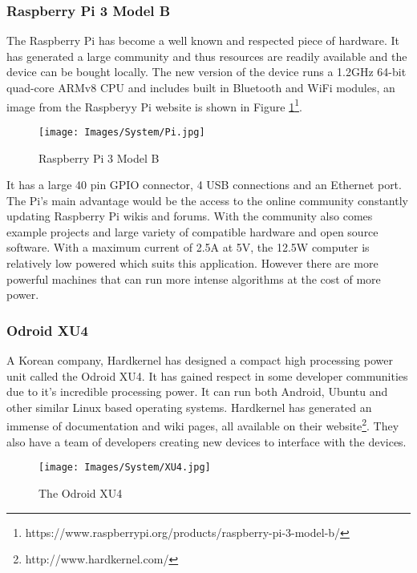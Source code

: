 				\subsubsection{Raspberry Pi 3 Model B}
				
				The Raspberry Pi has become a well known and respected piece of hardware. It has generated a large community and thus resources are readily available and the device can be bought locally. The new version of the device runs a 1.2GHz 64-bit quad-core ARMv8 CPU and includes built in Bluetooth and WiFi modules, an image from the Raspberyy Pi website is shown in Figure \ref{IM_Pi}\footnote{https://www.raspberrypi.org/products/raspberry-pi-3-model-b/}. 
				
				\begin{figure}[H]
					\centering
					\texttt{[image: Images/System/Pi.jpg]}     
					\caption{Raspberry Pi 3 Model B}
					\label{IM_Pi}
				\end{figure}
				
				It has a large 40 pin GPIO connector, 4 USB connections and an Ethernet port. The Pi's main advantage would be the access to the online community constantly updating Raspberry Pi wikis and forums. With the community also comes example projects and large variety of compatible hardware and open source software. With a maximum current of 2.5A at 5V, the 12.5W computer is relatively low powered which suits this application. However there are more powerful machines that can run more intense algorithms at the cost of more power.
		
				\subsubsection{Odroid XU4}
				A Korean company, Hardkernel has designed a compact high processing power unit called the Odroid XU4. It has gained respect in some developer communities due to it's incredible processing power. It can run both Android, Ubuntu and other similar Linux based operating systems. Hardkernel has generated an immense of documentation and wiki pages, all available on their website\footnote{http://www.hardkernel.com/}. They also have a team of developers creating new devices to interface with the devices. 
				
				\begin{figure}[H]
					\centering
					\texttt{[image: Images/System/XU4.jpg]}     
					\caption{The Odroid XU4}
					\label{IM_Odroid}
				\end{figure}
				
